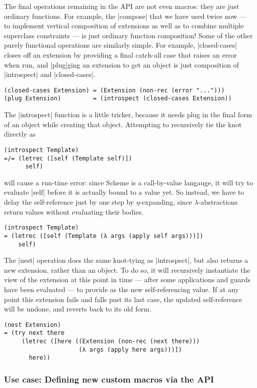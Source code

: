 The final operations remaining in the API are not even macros: they are just ordinary functions.
For example, the \scm|compose| that we have used twice now --- to implement vertical composition of extensions as well as to combine multiple superclass constraints --- is just ordinary function composition!
Some of the other purely functional operations are similarly simple.
For example, \scm|closed-cases| closes off an extension by providing a final catch-all case that raises an error when run, and \scm|plug|ging an extension to get an object is just composition of \scm|introspect| and \scm|closed-cases|.
\begin{verbatim}
(closed-cases Extension) = (Extension (non-rec (error "...")))
(plug Extension)         = (introspect (closed-cases Extension))
\end{verbatim}
The \scm|introspect| function is a little tricker, because it needs plug in the final form of an object while creating that object.
Attempting to recursively tie the knot directly as
\begin{verbatim}
(introspect Template)
=/= (letrec ([self (Template self)])
      self)
\end{verbatim}
will cause a run-time error: since Scheme is a call-by-value langauge, it will try to evaluate \scm|self| before it is actually bound to a value yet.
So instead, we have to delay the self-reference just by one step by $\eta$-expanding, since $\lambda$-abstractions return values without evaluating their bodies.
\begin{verbatim}
(introspect Template)
= (letrec ([self (Template (λ args (apply self args)))])
    self)
\end{verbatim}
The \scm|nest| operation does the same knot-tying as \scm|introspect|, but also returns a new extension, rather than an object.
To do so, it will recursively instantiate the view of the extension at this point in time --- after some applications and guards have been evaluated --- to provide as the new self-referencing value.
If at any point this extension fails and falls past its last case, the updated self-reference will be undone, and reverts back to its old form.
\begin{verbatim}
(nest Extension)
= (try next there
     (letrec ([here ((Extension (non-rec (next there)))
                     (λ args (apply here args)))])
       here))
\end{verbatim}

\subsubsection{Use case: Defining new custom macros via the API}

